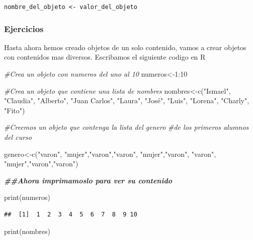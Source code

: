 \documentclass[
]{book}
\newenvironment{Shaded}{\begin{snugshade}}{\end{snugshade}}
\newcommand{\CommentTok}[1]{\textcolor[rgb]{0.56,0.35,0.01}{\textit{#1}}}
\newcommand{\DecValTok}[1]{\textcolor[rgb]{0.00,0.00,0.81}{#1}}
\newcommand{\DocumentationTok}[1]{\textcolor[rgb]{0.56,0.35,0.01}{\textbf{\textit{#1}}}}
\newcommand{\FunctionTok}[1]{\textcolor[rgb]{0.00,0.00,0.00}{#1}}
\newcommand{\NormalTok}[1]{#1}
\newcommand{\OtherTok}[1]{\textcolor[rgb]{0.56,0.35,0.01}{#1}}
\newcommand{\SpecialCharTok}[1]{\textcolor[rgb]{0.00,0.00,0.00}{#1}}
\newcommand{\StringTok}[1]{\textcolor[rgb]{0.31,0.60,0.02}{#1}}
\begin{document}
\texttt{nombre\_del\_objeto\ \textless{}-\ valor\_del\_objeto}

\hypertarget{ejercicios}{%
\subsubsection{\texorpdfstring{ Ejercicios}{ Ejercicios}}\label{ejercicios}}

Hasta ahora hemos creado objetos de un solo contenido, vamos a crear objetos con contenidos mas diversos. Escribamos el siguiente codigo en R

\begin{Shaded}
\begin{Highlighting}[]
\CommentTok{\#Crea un objeto con numeros del uno al 10}
\NormalTok{numeros}\OtherTok{\textless{}{-}}\DecValTok{1}\SpecialCharTok{:}\DecValTok{10}

\CommentTok{\#Crea un objeto que contiene una lista de nombres}
\NormalTok{nombres}\OtherTok{\textless{}{-}}\FunctionTok{c}\NormalTok{(}\StringTok{"Ismael"}\NormalTok{, }\StringTok{"Claudia"}\NormalTok{, }\StringTok{"Alberto"}\NormalTok{, }\StringTok{"Juan Carlos"}\NormalTok{, }\StringTok{"Laura"}\NormalTok{, }\StringTok{"José"}\NormalTok{, }\StringTok{"Luis"}\NormalTok{, }\StringTok{"Lorena"}\NormalTok{, }\StringTok{"Charly"}\NormalTok{, }\StringTok{"Fito"}\NormalTok{)}

\CommentTok{\#Creemos un objeto que contenga la lista del genero }
\CommentTok{\#de los primeros  alumnos del curso}

\NormalTok{genero}\OtherTok{\textless{}{-}}\FunctionTok{c}\NormalTok{(}\StringTok{"varon"}\NormalTok{, }\StringTok{"mujer"}\NormalTok{,}\StringTok{"varon"}\NormalTok{,}\StringTok{"varon"}\NormalTok{, }\StringTok{"mujer"}\NormalTok{,}\StringTok{"varon"}\NormalTok{, }\StringTok{"varon"}\NormalTok{, }\StringTok{"mujer"}\NormalTok{,}\StringTok{"varon"}\NormalTok{,}\StringTok{"varon"}\NormalTok{)}


\DocumentationTok{\#\#Ahora imprimamoslo para ver su contenido}

\FunctionTok{print}\NormalTok{(numeros)}
\end{Highlighting}
\end{Shaded}

\begin{verbatim}
##  [1]  1  2  3  4  5  6  7  8  9 10
\end{verbatim}

\begin{Shaded}
\begin{Highlighting}[]
\FunctionTok{print}\NormalTok{(nombres)}
\end{Highlighting}
\end{Shaded}
\end{document}

